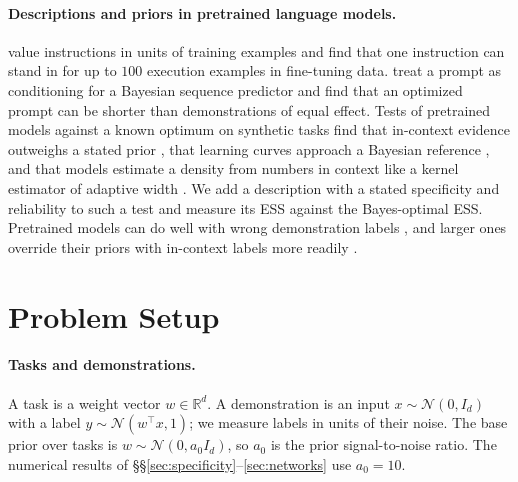 \documentclass{article}
\newcommand{\R}{\mathbb{R}}
\begin{document}
\paragraph{Descriptions and priors in pretrained language models.} \citet{cook2026} value instructions in units of training examples and find that one instruction can stand in for up to $100$ execution examples in fine-tuning data. \citet{wenliang2025} treat a prompt as conditioning for a Bayesian sequence predictor and find that an optimized prompt can be shorter than demonstrations of equal effect. Tests of pretrained models against a known optimum on synthetic tasks find that in-context evidence outweighs a stated prior \citep{gupta2025}, that learning curves approach a Bayesian reference \citep{akata2026}, and that models estimate a density from numbers in context like a kernel estimator of adaptive width \citep{liu2025}. We add a description with a stated specificity and reliability to such a test and measure its ESS against the Bayes-optimal ESS. Pretrained models can do well with wrong demonstration labels \citep{min2022}, and larger ones override their priors with in-context labels more readily \citep{wei2023}.

\section{Problem Setup}\label{sec:setting}

\paragraph{Tasks and demonstrations.} A task is a weight vector $w \in \R^d$. A demonstration is an input $x \sim \mathcal{N}(0, I_d)$ with a label $y \sim \mathcal{N}(w^\top x, 1)$; we measure labels in units of their noise. The base prior over tasks is $w \sim \mathcal{N}(0, a_0 I_d)$, so $a_0$ is the prior signal-to-noise ratio. The numerical results of \S\S\ref{sec:specificity}--\ref{sec:networks} use $a_0 = 10$.
\end{document}
